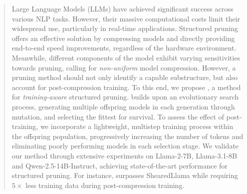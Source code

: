 \begin{abstract}
Large Language Models (LLMs) have achieved significant success across various NLP tasks. However, their massive computational costs limit their widespread use, particularly in real-time applications. Structured pruning offers an effective solution by compressing models and directly providing end-to-end speed improvements, regardless of the hardware environment. Meanwhile, different components of the model exhibit varying sensitivities towards pruning, calling for \emph{non-uniform} model compression. However, a pruning method should not only identify a capable substructure, but also account for post-compression training. To this end, we propose \sysname, a method for \emph{training-aware} structured pruning. \sysname builds upon an evolutionary search process, generating multiple offspring models in each generation through mutation, and selecting the fittest for survival. To assess the effect of post-training, we incorporate a lightweight, multistep training process within the offspring population, progressively increasing the number of tokens and eliminating poorly performing models in each selection stage.
We validate our method through extensive experiments on Llama-2-7B, Llama-3.1-8B and Qwen-2.5-14B-Instruct, achieving state-of-the-art performance for structured pruning. For instance, \sysname surpasses ShearedLlama while requiring $5\times$ less training data during post-compression training. 
\end{abstract}